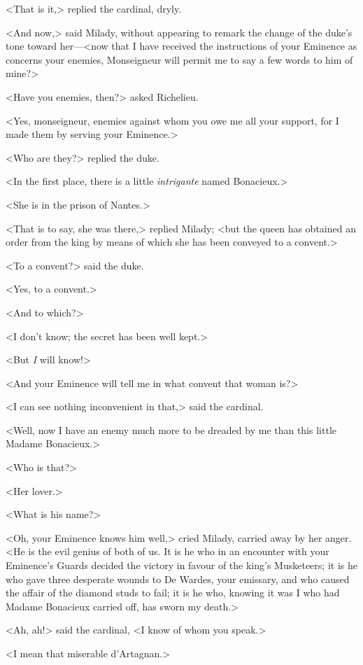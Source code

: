 <That is it,> replied the cardinal, dryly. 

<And now,> said Milady, without appearing to remark the change of the duke's tone toward her---<now that I have received the instructions of your Eminence as concerns your enemies, Monseigneur will permit me to say a few words to him of mine?> 

<Have you enemies, then?> asked Richelieu. 

<Yes, monseigneur, enemies against whom you owe me all your support, for I made them by serving your Eminence.> 

<Who are they?> replied the duke. 

<In the first place, there is a little \textit{intrigante} named Bonacieux.> 

<She is in the prison of Nantes.> 

<That is to say, she was there,> replied Milady; <but the queen has obtained an order from the king by means of which she has been conveyed to a convent.> 

<To a convent?> said the duke. 

<Yes, to a convent.> 

<And to which?> 

<I don't know; the secret has been well kept.> 

<But \textit{I} will know!> 

<And your Eminence will tell me in what convent that woman is?> 

<I can see nothing inconvenient in that,> said the cardinal. 

<Well, now I have an enemy much more to be dreaded by me than this little Madame Bonacieux.> 

<Who is that?> 

<Her lover.> 

<What is his name?> 

<Oh, your Eminence knows him well,> cried Milady, carried away by her anger. <He is the evil genius of both of us. It is he who in an encounter with your Eminence's Guards decided the victory in favour of the king's Musketeers; it is he who gave three desperate wounds to De Wardes, your emissary, and who caused the affair of the diamond studs to fail; it is he who, knowing it was I who had Madame Bonacieux carried off, has sworn my death.> 

<Ah, ah!> said the cardinal, <I know of whom you speak.> 

<I mean that miserable d'Artagnan.> 

